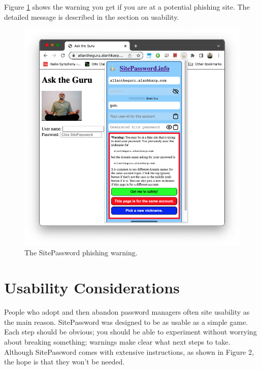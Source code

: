 Figure \ref{fig:phishing} shows the warning you get if you are at a potential phishing site.  The
detailed message is described in the section on usability.
 
\begin{figure}
\begin{center}
  \includegraphics[scale=0.20]{soupsfig3.png}
\end{center}
\caption{\label{fig:phishing} The SitePassword phishing warning. }
\end{figure}

\section{Usability Considerations}\label{usability}

People who adopt and then abandon password managers often site usability 
as the main reason.  SitePassword was designed to be as usable as a simple
game.  Each step should be obvious; you should be able to experiment without
worrying about breaking something; warnings make clear what next steps to take.
Although SitePassword comes with extensive instructions, as shown in Figure 2, 
the hope is that they won't be needed.

